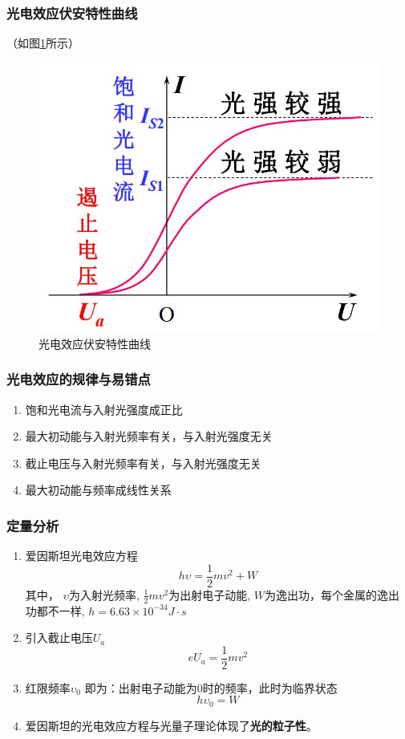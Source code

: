 \documentclass{ctexart}
\begin{document}
\subsubsection{光电效应伏安特性曲线}

（如图\ref{figure15.1}所示）

\begin{figure}[h]
	\centering
	\includegraphics[scale=0.3]{images//chapter_15//figure_15.1.jpg} 
	\caption{光电效应伏安特性曲线}\label{figure15.1}
\end{figure}

\subsubsection{光电效应的规律与易错点}
\begin{enumerate}
	\item 饱和光电流与入射光强度成正比
	\item 最大初动能与入射光频率有关，与入射光强度无关
	\item 截止电压与入射光频率有关，与入射光强度无关
	\item 最大初动能与频率成线性关系
\end{enumerate}

\subsubsection{定量分析}
\begin{enumerate}
	\item 爱因斯坦光电效应方程
	$$h\upsilon = \frac{1}{2}mv^2+W$$
    其中，
    $\upsilon$为入射光频率,
    $\frac{1}{2}mv^2$为出射电子动能,
    $W$为逸出功，每个金属的逸出功都不一样,
    $h=6.63\times 10^{-34}J\cdot s$
	\item 引入截止电压$U_a$
    $$eU_a=\frac{1}{2}mv^2$$
	\item 红限频率$\upsilon_0$
    即为：出射电子动能为0时的频率，此时为临界状态
    $$h\upsilon_0 =W$$
	\item 爱因斯坦的光电效应方程与光量子理论体现了\textbf{光的粒子性}。
\end{enumerate}
\end{document}
